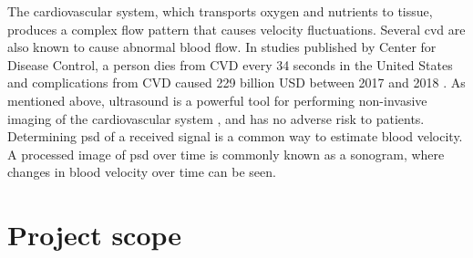 The cardiovascular system, which transports oxygen and nutrients to tissue, produces a complex flow pattern that causes velocity fluctuations. Several \gls{cvd} are also known to cause abnormal blood flow. In studies published by Center for Disease Control, a person dies from CVD every 34 seconds in the United States and complications from CVD caused 229 billion USD between 2017 and 2018 \cite{cdc_2022}. As mentioned above, ultrasound is a powerful tool for performing non-invasive imaging of the cardiovascular system \cite{JensenUltrasoundBook,Hansen_thesis}, and has no adverse risk to patients. Determining \gls{psd} of a received signal is a common way to estimate blood velocity. A processed image of \gls{psd} over time is commonly known as a sonogram, where changes in blood velocity over time can be seen.

\section{Project scope}
